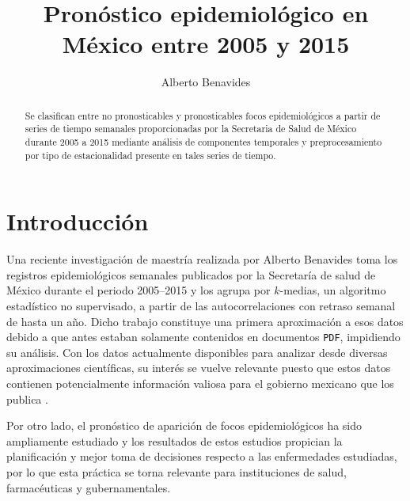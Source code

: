 \documentclass[final,5p,times,twocolumn]{elsarticle}
\begin{document}
\begin{frontmatter}
\title{Pronóstico epidemiológico en México entre 2005 y 2015}

\author{Alberto Benavides}
\address{Posgrado de Ingeniería de Sistemas\\
Facultad de Ingeniería Mecánica y Eléctrica\\
Universidad Autónoma de Nuevo León\\
Nuevo León, México \\}

\begin{abstract}
  Se clasifican entre no pronosticables y pronosticables focos epidemiológicos a partir de series de tiempo semanales proporcionadas por la Secretaria de Salud de México durante 2005 a 2015 mediante análisis de componentes temporales y preprocesamiento por tipo de estacionalidad presente en tales series de tiempo.
  \end{abstract}
\end{frontmatter}

\section{Introducción}
\label{sec:introduction}
Una reciente investigación de maestría realizada por Alberto Benavides \cite{benavides2019} toma los registros epidemiológicos semanales publicados por la Secretaría de salud de México durante el periodo 2005--2015 \cite{boletin} y los agrupa por $k$-medias, un algoritmo estadístico no supervisado, a partir de las autocorrelaciones con retraso semanal de hasta un año. Dicho trabajo constituye una primera aproximación a esos datos debido a que antes estaban solamente contenidos en documentos \texttt{PDF}, impidiendo su análisis. Con los datos actualmente disponibles para analizar desde diversas aproximaciones científicas, su interés se vuelve relevante puesto que estos datos contienen potencialmente información valiosa para el gobierno mexicano que los publica \cite{datosMex}.

Por otro lado, el pronóstico de aparición de focos epidemiológicos ha sido ampliamente estudiado \cite{brockwell2016, lindenEA2003, burkomEA2007, ozgurEA2014, abdullahEA2012, zinszerEA1992} y los resultados de estos estudios propician la planificación y mejor toma de decisiones respecto a las enfermedades estudiadas, por lo que esta práctica se torna relevante para instituciones de salud, farmacéuticas y gubernamentales.
\end{document}
